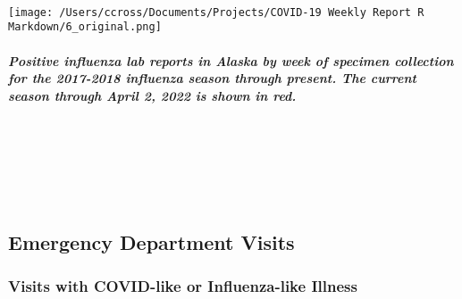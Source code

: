 \documentclass[
]{article}
\begin{document}
~

\texttt{[image: /Users/ccross/Documents/Projects/COVID-19 Weekly Report R Markdown/6\_original.png]}

\hypertarget{positive-influenza-lab-reports-in-alaska-by-week-of-specimen-collection-for-the-2017-2018-influenza-season-through-present.-the-current-season-through-april-2-2022-is-shown-in-red.}{%
\subparagraph{Positive influenza lab reports in Alaska by week of
specimen collection for the 2017-2018 influenza season through present.
The current season through April 2, 2022 is shown in
red.}\label{positive-influenza-lab-reports-in-alaska-by-week-of-specimen-collection-for-the-2017-2018-influenza-season-through-present.-the-current-season-through-april-2-2022-is-shown-in-red.}}

~

~

~

\hypertarget{emergency-department-visits}{%
\subsection{Emergency Department
Visits}\label{emergency-department-visits}}

\hypertarget{visits-with-covid-like-or-influenza-like-illness}{%
\subsubsection*{Visits with COVID-like or Influenza-like
Illness}\label{visits-with-covid-like-or-influenza-like-illness}}
\end{document}

